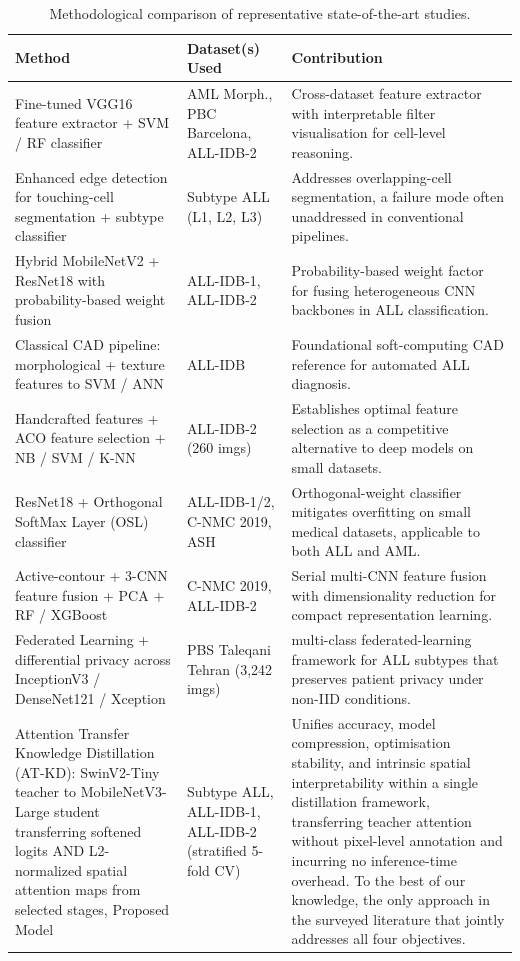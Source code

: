 \documentclass[preprint,review,12pt]{elsarticle}
\begin{document}
\begin{table}[tbp]
\centering
\caption{Methodological comparison of representative state-of-the-art studies.}
\label{tab:method_comp}
\footnotesize
\renewcommand{\arraystretch}{1.2}
\setlength{\tabcolsep}{3pt}
\begin{tabular}{L{0.28\textwidth} L{0.22\textwidth} L{0.40\textwidth}}
\toprule
\textbf{Method} & \textbf{Dataset(s) Used} & \textbf{Contribution} \\
\midrule
Fine-tuned VGG16 feature extractor + SVM / RF classifier \cite{ref47} & AML Morph., PBC Barcelona, ALL-IDB-2 & Cross-dataset feature extractor with interpretable filter visualisation for cell-level reasoning. \\
Enhanced edge detection for touching-cell segmentation + subtype classifier \cite{ref48} & Subtype ALL (L1, L2, L3) & Addresses overlapping-cell segmentation, a failure mode often unaddressed in conventional pipelines. \\
Hybrid MobileNetV2 + ResNet18 with probability-based weight fusion \cite{ref51} & ALL-IDB-1, ALL-IDB-2 & Probability-based weight factor for fusing heterogeneous CNN backbones in ALL classification. \\
Classical CAD pipeline: morphological + texture features to SVM / ANN \cite{ref52} & ALL-IDB & Foundational soft-computing CAD reference for automated ALL diagnosis. \\
Handcrafted features + ACO feature selection + NB / SVM / K-NN \cite{ref53} & ALL-IDB-2 (260 imgs) & Establishes optimal feature selection as a competitive alternative to deep models on small datasets. \\
ResNet18 + Orthogonal SoftMax Layer (OSL) classifier \cite{ref54} & ALL-IDB-1/2, C-NMC 2019, ASH & Orthogonal-weight classifier mitigates overfitting on small medical datasets, applicable to both ALL and AML. \\
Active-contour + 3-CNN feature fusion + PCA + RF / XGBoost \cite{ref55} & C-NMC 2019, ALL-IDB-2 & Serial multi-CNN feature fusion with dimensionality reduction for compact representation learning. \\
Federated Learning + differential privacy across InceptionV3 / DenseNet121 / Xception \cite{ref56} & PBS Taleqani Tehran (3,242 imgs) & multi-class federated-learning framework for ALL subtypes that preserves patient privacy under non-IID conditions. \\
Attention Transfer Knowledge Distillation (AT-KD): SwinV2-Tiny teacher to MobileNetV3-Large student transferring softened logits AND L2-normalized spatial attention maps from selected stages, Proposed Model & Subtype ALL, ALL-IDB-1, ALL-IDB-2 (stratified 5-fold CV) & Unifies accuracy, model compression, optimisation stability, and intrinsic spatial interpretability within a single distillation framework, transferring teacher attention without pixel-level annotation and incurring no inference-time overhead. To the best of our knowledge, the only approach in the surveyed literature that jointly addresses all four objectives. \\
\bottomrule
\end{tabular}
\end{table}
\end{document}
